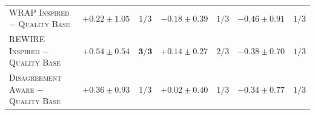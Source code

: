 \begin{table}[t]
\begin{tabular}{lcccccc}
\textsc{WRAP Inspired} $-$ \textsc{Quality Base} & $+0.22 \pm 1.05$ & $1/3$ & $-0.18 \pm 0.39$ & $1/3$ & $-0.46 \pm 0.91$ & $1/3$ \\
\textsc{REWIRE Inspired} $-$ \textsc{Quality Base} & $+0.54 \pm 0.54$ & $\mathbf{3/3}$ & $+0.14 \pm 0.27$ & $2/3$ & $-0.38 \pm 0.70$ & $1/3$ \\
\textsc{Disagreement Aware} $-$ \textsc{Quality Base} & $+0.36 \pm 0.93$ & $1/3$ & $+0.02 \pm 0.40$ & $1/3$ & $-0.34 \pm 0.77$ & $1/3$ \\
\bottomrule
\end{tabular}
\end{table}

\begin{table}[t]
\centering
\caption{Pairwise paired differences on the MMLU macro-average at each epoch boundary, for all $15$ pairs of settings. Each cell is the mean over seeds $42$, $43$ and $44$ of the per-seed difference (first setting minus second) in accuracy points, with the standard deviation over the three per-seed differences, followed by the number of seeds in which the first setting is higher. The six settings at a given seed share initialization, so differences are paired within seed. $0/3$ means the second setting is higher in every seed.}
\label{tab:pairwise-mmlu}
\footnotesize
\setlength{\tabcolsep}{3.5pt}
\renewcommand{\arraystretch}{1.15}


\end{table}
